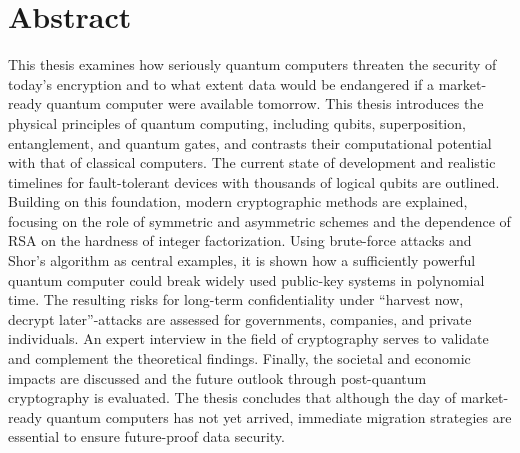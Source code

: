 
\chapter*{Abstract}
This thesis examines how seriously quantum computers threaten the security of today’s encryption and to what extent data would be endangered if a market-ready quantum computer were available tomorrow. 
This thesis introduces the physical principles of quantum computing, including qubits, superposition, entanglement, and quantum gates, and contrasts their computational potential with that of classical computers. 
The current state of development and realistic timelines for fault-tolerant devices with thousands of logical qubits are outlined. 
Building on this foundation, modern cryptographic methods are explained, focusing on the role of symmetric and asymmetric schemes and the dependence of RSA on the hardness of integer factorization. 
Using brute-force attacks and Shor's algorithm as central examples, it is shown how a sufficiently powerful quantum computer could break widely used public-key systems in polynomial time.
The resulting risks for long-term confidentiality under ``harvest now, decrypt later''-attacks are assessed for governments, companies, and private individuals. An expert interview in the field of cryptography serves to validate and complement the theoretical findings.
Finally, the societal and economic impacts are discussed and the future outlook through post-quantum cryptography is evaluated.
The thesis concludes that although the day of market-ready quantum computers has not yet arrived, immediate migration strategies are essential to ensure future-proof data security.

